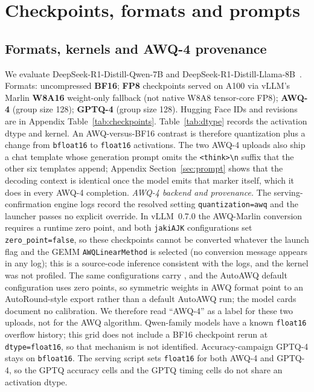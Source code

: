 \documentclass[11pt,a4paper]{article}
\begin{document}
\FloatBarrier
\section{Checkpoints, formats and prompts}
\label{app:provenance}
\subsection{Formats, kernels and AWQ-4 provenance}
\label{sec:formats}
We evaluate DeepSeek-R1-Distill-Qwen-7B and DeepSeek-R1-Distill-Llama-8B~\cite{guo2025deepseekr1}. Formats: uncompressed \textbf{BF16}; \textbf{FP8} checkpoints served on A100 via vLLM's Marlin \textbf{W8A16} weight-only fallback (not native W8A8 tensor-core FP8); \textbf{AWQ-4} (group size 128); \textbf{GPTQ-4} (group size 128). Hugging Face IDs and revisions are in Appendix Table~\ref{tab:checkpoints}. Table~\ref{tab:dtype} records the activation dtype and kernel. An AWQ-versus-BF16 contrast is therefore quantization plus a change from \texttt{bfloat16} to \texttt{float16} activations. The two AWQ-4 uploads also ship a chat template whose generation prompt omits the \texttt{<think>\textbackslash n} suffix that the other six templates append; Appendix Section~\ref{sec:prompt} shows that the decoding context is identical once the model emits that marker itself, which it does in every AWQ-4 completion. \emph{AWQ-4 backend and provenance.} The serving-confirmation engine logs record the resolved setting \texttt{quantization=awq} and the launcher passes no explicit override. In vLLM~0.7.0 the AWQ-Marlin conversion requires a runtime zero point, and both \texttt{jakiAJK} configurations set \texttt{zero\_point=false}, so these checkpoints cannot be converted whatever the launch flag and the GEMM \texttt{AWQLinearMethod} is selected (no conversion message appears in any log); this is a source-code inference consistent with the logs, and the kernel was not profiled. The same configurations carry  , and the AutoAWQ default configuration uses zero points, so symmetric weights in AWQ format point to an AutoRound-style export rather than a default AutoAWQ run; the model cards document no calibration. We therefore read ``AWQ-4'' as a label for these two uploads, not for the AWQ algorithm. Qwen-family models have a known \texttt{float16} overflow history; this grid does not include a BF16 checkpoint rerun at \texttt{dtype=float16}, so that mechanism is not identified. Accuracy-campaign GPTQ-4 stays on \texttt{bfloat16}. The serving script sets \texttt{float16} for both AWQ-4 and GPTQ-4, so the GPTQ accuracy cells and the GPTQ timing cells do not share an activation dtype.
\end{document}
